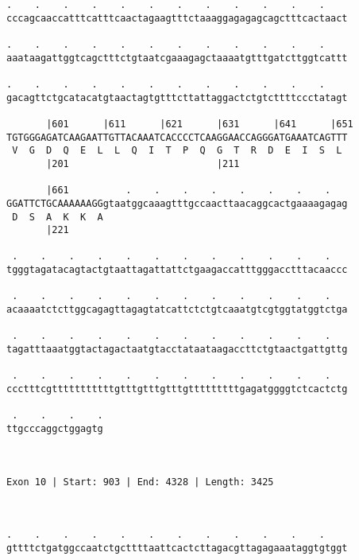 \documentclass{article}
\begin{document}
\begin{Verbatim}
.    .    .    .    .    .    .    .    .    .    .    .    
cccagcaaccatttcatttcaactagaagtttctaaaggagagagcagctttcactaact
                                                            
.    .    .    .    .    .    .    .    .    .    .    .    
aaataagattggtcagctttctgtaatcgaaagagctaaaatgtttgatcttggtcattt
                                                            
.    .    .    .    .    .    .    .    .    .    .    .    
gacagttctgcatacatgtaactagtgtttcttattaggactctgtcttttccctatagt
                                                            
       |601      |611      |621      |631      |641      |651
TGTGGGAGATCAAGAATTGTTACAAATCACCCCTCAAGGAACCAGGGATGAAATCAGTTT
 V  G  D  Q  E  L  L  Q  I  T  P  Q  G  T  R  D  E  I  S  L 
       |201                          |211                   
  
       |661          .    .    .    .    .    .    .    .   
GGATTCTGCAAAAAAGGgtaatggcaaagtttgccaacttaacaggcactgaaaagagag
 D  S  A  K  K  A                                           
       |221                                                 
  
 .    .    .    .    .    .    .    .    .    .    .    .   
tgggtagatacagtactgtaattagattattctgaagaccatttgggacctttacaaccc
                                                            
 .    .    .    .    .    .    .    .    .    .    .    .   
acaaaatctcttggcagagttagagtatcattctctgtcaaatgtcgtggtatggtctga
                                                            
 .    .    .    .    .    .    .    .    .    .    .    .   
tagatttaaatggtactagactaatgtacctataataagaccttctgtaactgattgttg
                                                            
 .    .    .    .    .    .    .    .    .    .    .    .   
ccctttcgtttttttttttgtttgtttgtttgtttttttttgagatggggtctcactctg
                                                            
 .    .    .    .
ttgcccaggctggagtg
                 
                 
 
Exon 10 | Start: 903 | End: 4328 | Length: 3425



.    .    .    .    .    .    .    .    .    .    .    .    
gttttctgatggccaatctgcttttaattcactcttagacgttagagaaataggtgtggt
                                                            

\end{Verbatim}
\end{document}
